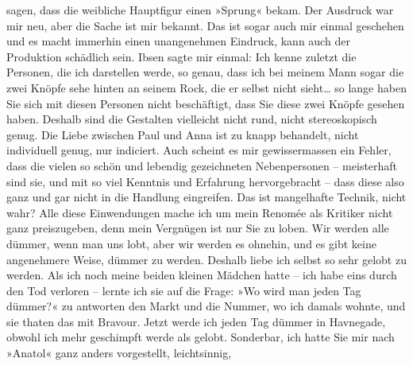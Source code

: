 \begin{ledgroupsized}[t]{13cm}
               sagen, dass die weibliche Hauptfigur einen »Sprung« bekam. Der Ausdruck war mir neu,
               aber die Sache ist mir bekannt. Das ist sogar auch mir einmal geschehen und es macht
               immerhin einen unangenehmen Eindruck, kann auch der Produktion schädlich sein. Ibsen sagte mir einmal: Ich kenne zuletzt die
               Personen, die ich darstellen werde, so genau, dass
               ich bei meinem Mann sogar die zwei Knöpfe sehe hinten an seinem Rock, die er selbst
               nicht sieht{\dots} so lange haben Sie sich mit diesen Personen
               nicht beschäftigt, dass Sie diese zwei Knöpfe gesehen haben. Deshalb sind die
               Gestalten vielleicht nicht rund, nicht stereoskopisch genug. Die Liebe zwischen Paul
               und Anna ist zu knapp behandelt, nicht individuell genug, nur indiciert. Auch scheint
               es mir gewissermassen ein Fehler, dass die vielen so schön und lebendig gezeichneten
               Nebenpersonen – meisterhaft sind sie, und mit so viel Kenntnis und Erfahrung
               hervorgebracht – dass diese also ganz und gar nicht in die Handlung eingreifen. Das
               ist mangelhafte Technik, nicht wahr?\pend
           \pstart
           Alle diese Einwendungen mache ich um mein Renomée als Kritiker nicht ganz
               preiszugeben, denn mein Vergnügen ist nur Sie zu loben. Wir werden alle dümmer, wenn
               man uns lobt, aber wir werden es ohnehin, und es gibt keine angenehmere Weise, dümmer
               zu werden. Deshalb liebe ich selbst so sehr gelobt zu werden. Als ich noch meine
               beiden kleinen Mädchen hatte – {\pb}ich habe
                  eins durch den Tod
               verloren – lernte ich sie auf die Frage: »Wo wird man jeden Tag dümmer?« zu antworten
               den Markt und die Nummer, wo ich damals wohnte, und sie thaten das mit Bravour. Jetzt
               werde ich jeden Tag dümmer in Havnegade, obwohl
               ich mehr geschimpft werde als gelobt. Sonderbar, ich hatte Sie mir nach »Anatol« ganz anders vorgestellt, leichtsinnig,

\end{ledgroupsized}
